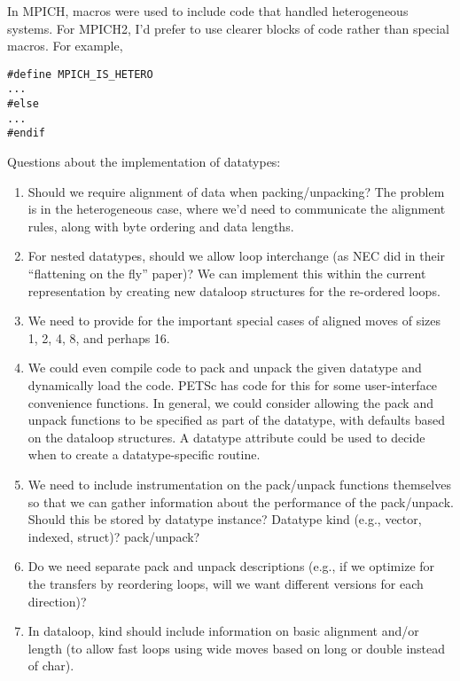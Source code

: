 \documentclass{article}
\begin{document}
In MPICH, macros were used to include code that handled heterogeneous
systems.  For MPICH2, I'd prefer to use clearer blocks of code rather
than special macros.  For example,
\begin{verbatim}
#define MPICH_IS_HETERO
...
#else
...
#endif
\end{verbatim}

Questions about the implementation of datatypes:

\begin{enumerate}
\item Should we require alignment of data when packing/unpacking?  The
   problem is in the heterogeneous case, where we'd need to communicate
   the alignment rules, along with byte ordering and data lengths.

\item For nested datatypes, should we allow loop interchange (as NEC did
   in their ``flattening on the fly'' paper)?  We can implement this
   within the current representation by creating new dataloop
   structures for the re-ordered loops.  

\item We need to provide for the important special cases of aligned moves
   of sizes 1, 2, 4, 8, and perhaps 16.

\item We could even compile code to pack and unpack the given datatype
   and dynamically load the code.  PETSc has code for this for some
   user-interface convenience functions.  In general, we could
   consider allowing the pack and unpack functions to be specified as
   part of the datatype, with defaults based on the dataloop
   structures.  A datatype attribute could be used to decide when to
   create a datatype-specific routine.

\item We need to include instrumentation on the pack/unpack functions
   themselves so that we can gather information about the performance
   of the pack/unpack.  Should this be stored by datatype instance?
   Datatype kind (e.g., vector, indexed, struct)?  pack/unpack?

\item Do we need separate pack and unpack descriptions (e.g., if we
   optimize for the transfers by reordering loops, will we want
   different versions for each direction)?

\item In dataloop, kind should include information on basic alignment
   and/or length (to allow fast loops using wide moves based on long
   or double instead of char).


\end{enumerate}
\end{document}
